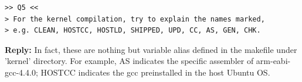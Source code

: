 \documentclass[12pt,journal,draftclsnofoot,onecolumn]{IEEEtran}
\begin{document}
\begin{verbatim}
>> Q5 <<
> For the kernel compilation, try to explain the names marked, 
> e.g. CLEAN, HOSTCC, HOSTLD, SHIPPED, UPD, CC, AS, GEN, CHK.
\end{verbatim}
\textbf{Reply:} In fact, these are nothing but variable alias defined in the makefile under 'kernel' directory.
For example, AS indicates the specific assembler of arm-eabi-gcc-4.4.0; HOSTCC indicates the gcc preinstalled
in the host Ubuntu OS. 


%
%
\clearpage
\end{document}
